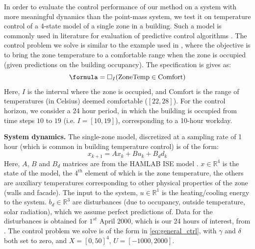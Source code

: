 
In order to evaluate the control performance of our method on a system with more meaningful dynamics than the point-mass system, we test it on temperature control of a 4-state model of a single zone in a building. Such a model is commonly used in literature for evaluation of predictive control algorithms \cite{Jain2016}. The control problem we solve is similar to the example used in \cite{Raman14_MPCSTL}, where the objective is to bring the zone temperature to a comfortable range when the zone is occupied (given predictions on the building occupancy). The specification is gives as:
\begin{equation}
\label{eq:BldgSpec}
\formula = \always_I(\text{ZoneTemp} \in \text{Comfort})
\end{equation}
Here, $I$ is the interval where the zone is occupied, and $\text{Comfort}$ is the range of temperatures (in Celsius) deemed comfortable ($[22,28]$). For the control horizon, we consider a 24 hour period, in which the building is occupied from time steps $10$ to $19$ (i.e. $I=[10,19]$), corresponding to a 10-hour workday. 

\textbf{System dynamics.} The single-zone model, discretized at a sampling rate of 1 hour (which is common in building temperature control) is of the form:
\begin{equation}
\label{eq:bldg_dyn}
x_{k+1} = Ax_{k}+Bu_k+B_dd_k
\end{equation}
Here, $A$, $B$ and $B_d$ matrices are from the HAMLAB ISE model \cite{VanSchijndel2005}. $x \in \mathbb{R}^4$ is the state of the model, the $4^{th}$ element of which is the zone temperature, the others are auxiliary temperatures corresponding to other physical properties of the zone (walls and facade). The input to the system, $u \in \mathbb{R}^1$ is the heating/cooling energy to the system. $b_d \in \mathbb{R}^3$ are disturbances (due to occupancy, outside temperature, solar radiation), which we assume perfect predictions of. Data for the disturbances is obtained for $1^{st}$ April 2000, which is our 24 hours of interest, from \cite{VanSchijndel2005}. The control problem we solve is of the form in \eqref{eq:general_ctrl}, with $\gamma$ and $\delta$ both set to zero, and $X=[0,50]^4$, $U=[-1000,2000]$.

